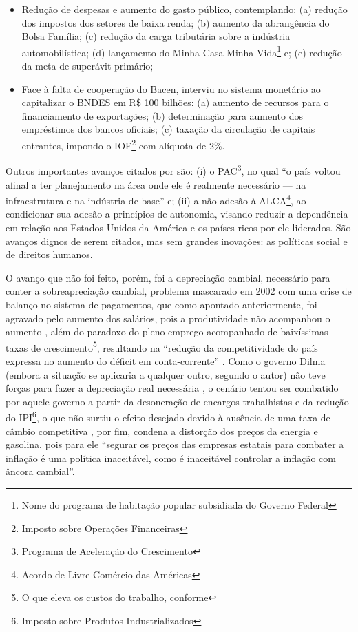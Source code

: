 	\begin{itemize}
		\item Redução de despesas e aumento do gasto público, contemplando: (a) redução dos impostos dos setores de baixa renda; (b) aumento da abrangência do Bolsa Família; (c) redução da carga tributária sobre a indústria automobilística; (d) lançamento do Minha Casa Minha Vida\footnote{Nome do programa de habitação popular subsidiada do Governo Federal} e; (e) redução da meta de superávit primário;
		\item Face à falta de cooperação do Bacen, interviu no sistema monetário ao capitalizar o BNDES em R\$ 100 bilhões: (a) aumento de recursos para o financiamento de exportações; (b) determinação para aumento dos empréstimos dos bancos oficiais; (c) taxação da circulação de capitais entrantes, impondo o IOF\footnote{Imposto sobre Operações Financeiras} com alíquota de 2\%.
	\end{itemize}
	
	Outros importantes avanços citados por  são: (i) o PAC\footnote{Programa de Aceleração do Crescimento}, no qual ``o país voltou afinal a ter planejamento na área onde ele é realmente necessário --- na infraestrutura e na indústria de base''\cite[p. 353]{Bresser2016} e; (ii) a não adesão à ALCA\footnote{Acordo de Livre Comércio das Américas}, ao condicionar sua adesão a princípios de autonomia, visando reduzir a dependência em relação aos Estados Unidos da América e os países ricos por ele liderados. São avanços dignos de serem citados, mas sem grandes inovações: as políticas social e de direitos humanos.
	
	O avanço que não foi feito, porém, foi a depreciação cambial, necessário para conter a sobreapreciação cambial, problema mascarado em 2002 com uma crise de balanço no sistema de pagamentos, que como apontado anteriormente, foi agravado pelo aumento dos salários, pois a produtividade não acompanhou o aumento \cite[p. 355]{Bresser2016}, além do paradoxo do pleno emprego acompanhado de baixíssimas taxas de crescimento\footnote{O que eleva os custos do trabalho, conforme }, resultando na ``redução da competitividade do país expressa no aumento do déficit em conta-corrente'' \cite[p. 358]{Bresser2016}. Como o governo Dilma (embora a situação se aplicaria a qualquer outro, segundo o autor) não teve forças para fazer a depreciação real necessária \cite[p. 359]{Bresser2016}, o cenário tentou ser combatido por aquele governo a partir da desoneração de encargos trabalhistas e da redução do IPI\footnote{Imposto sobre Produtos Industrializados}, o que não surtiu o efeito desejado devido à ausência de uma taxa de câmbio competitiva \cite[p. 359]{Bresser2016}, por fim,  condena a distorção dos preços da energia e gasolina, pois para ele ``segurar os preços das empresas estatais para combater a inflação é uma política inaceitável, como é inaceitável controlar a inflação com âncora cambial''.
	
